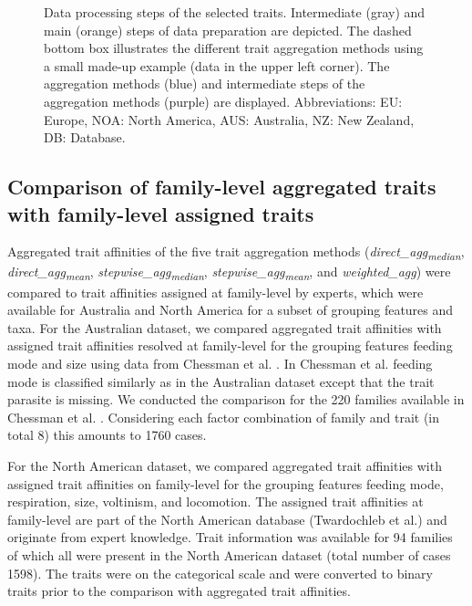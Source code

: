 \documentclass{article}
\begin{document}
\begin{figure}
  \centering
  
  \caption{Data processing steps of the selected traits. Intermediate (gray) and main (orange) steps of data preparation are depicted. The dashed bottom box illustrates the different trait aggregation methods using a small made-up example (data in the upper left corner). The aggregation methods (blue) and intermediate steps of the aggregation methods (purple) are displayed. Abbreviations: EU: Europe, NOA: North America, AUS: Australia, NZ: New Zealand, DB: Database.}
  \label{fig:data_proc_overview}
\end{figure}


\subsection*{Comparison of family-level aggregated traits with family-level assigned traits}

Aggregated trait affinities of the five trait aggregation methods (\textit{direct\_agg\textsubscript{median}}, \textit{direct\_agg\textsubscript{mean}}, \textit{stepwise\_agg\textsubscript{median}}, \textit{stepwise\_agg\textsubscript{mean}}, and \textit{weighted\_agg}) were compared to trait affinities assigned at family-level by experts, which were available for Australia and North America for a subset of grouping features and taxa. For the Australian dataset, we compared aggregated trait affinities with assigned trait affinities resolved at family-level for the grouping features feeding mode and size using data from Chessman et al. \cite{chessman_dissolved-oxygen_2018}. In Chessman et al. \cite{chessman_dissolved-oxygen_2018} feeding mode is classified similarly as in the Australian dataset except that the trait parasite is missing. We conducted the comparison for the 220 families available in Chessman et al. \cite{chessman_dissolved-oxygen_2018}. Considering each factor combination of family and trait (in total 8) this amounts to 1760 cases.

For the North American dataset, we compared aggregated trait affinities with assigned trait affinities on family-level for the grouping features feeding mode, respiration, size, voltinism, and locomotion. The assigned trait affinities at family-level are part of the North American database (Twardochleb et al.) \cite{twardochleb_trait_data_2020} and originate from expert knowledge. Trait information was available for 94 families of which all were present in the North American dataset (total number of cases 1598). The traits were on the categorical scale and were converted to binary traits prior to the comparison with aggregated trait affinities.
\end{document}
